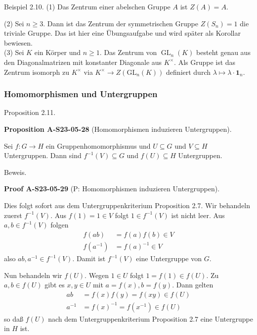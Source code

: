 \documentclass[10pt, letterpaper]{article}
\newcommand{\CustomHeading}[3]{%
  \par\medskip\noindent%
  \textbf{#1 #2} \textnormal{(#3)}.\enskip%
}
\newenvironment{PROP}[2]{\begin{unitbox}\CustomHeading{Proposition}{#1}{#2}}{\end{unitbox}}
\newenvironment{PROOF}[2]{\begin{unitbox}\CustomHeading{Proof}{#1}{#2}}{\end{unitbox}}
\begin{document}
Beispiel 2.10. (1) Das Zentrum einer abelschen Gruppe $A$ ist $Z(A)=A$.


(2) Sei $n \geq 3$. Dann ist das Zentrum der symmetrischen Gruppe $Z\left(S_{n}\right)=1$ die triviale Gruppe. Das ist hier eine Übungsaufgabe und wird später als Korollar bewiesen.\\


(3) Sei $K$ ein Körper und $n \geq 1$. Das Zentrum von $\operatorname{GL}_{n}(K)$ besteht genau aus den Diagonalmatrizen mit konstanter Diagonale aus $K^{\times}$. Als Gruppe ist das Zentrum isomorph zu $K^{\times}$ via $K^{\times} \rightarrow Z\left(\mathrm{GL}_{n}(K)\right)$ definiert durch $\lambda \mapsto \lambda \cdot \mathbf{1}_{n}$.




\subsubsection{Homomorphismen und Untergruppen}



Proposition 2.11. 

\begin{PROP}{A-S23-05-28}{Homomorphismen induzieren Untergruppen}
Sei $f: G \rightarrow H$ ein Gruppenhomomorphismus und $U \subseteq G$ und $V \subseteq H$ Untergruppen. Dann sind $f^{-1}(V) \subseteq G$ und $f(U) \subseteq H$ Untergruppen.
\end{PROP}



Beweis. 

\begin{PROOF}{A-S23-05-29}{P: Homomorphismen induzieren Untergruppen}
Dies folgt sofort aus dem Untergruppenkriterium Proposition 2.7. Wir behandeln zuerst $f^{-1}(V)$. Aus $f(1)=1 \in V$ folgt $1 \in f^{-1}(V)$ ist nicht leer. Aus $a, b \in f^{-1}(V)$ folgen
$$
\begin{aligned}
f(a b) & =f(a) f(b) \in V \\
f\left(a^{-1}\right) & =f(a)^{-1} \in V
\end{aligned}
$$
also $a b, a^{-1} \in f^{-1}(V)$. Damit ist $f^{-1}(V)$ eine Untergruppe von $G$.

Nun behandeln wir $f(U)$. Wegen $1 \in U$ folgt $1=f(1) \in f(U)$. Zu $a, b \in f(U)$ gibt es $x, y \in U$ mit $a=f(x), b=f(y)$. Dann gelten
$$
\begin{aligned}
a b & =f(x) f(y)=f(x y) \in f(U) \\
a^{-1} & =f(x)^{-1}=f\left(x^{-1}\right) \in f(U)
\end{aligned}
$$
so daß $f(U)$ nach dem Untergruppenkriterium Proposition 2.7 eine Untergruppe in $H$ ist.
\end{PROOF}
\end{document}
